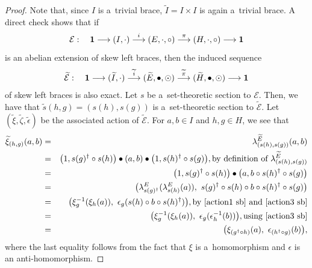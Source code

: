 \documentclass{jonasart}
\theoremstyle{plain}
\begin{document}
	\begin{proof}
		Note that, since $I$ is a~trivial brace, $\widetilde{I}= I \times I$ is again a~trivial brace. A direct check shows that if
		\[
		\mathcal{E} : \quad  {\bf 1} \longrightarrow (I,\cdot) \stackrel{i}{\longrightarrow}  (E,\cdot,\circ) \stackrel{\pi}{\longrightarrow} (H,\cdot,\circ) \longrightarrow {\bf 1}
		\]
		is an abelian extension of skew left braces, then the induced sequence
		\[
		\widetilde{\mathcal{E}}: \quad  {\bf 1} \longrightarrow (\widetilde{I},\cdot) \stackrel{\widetilde{i}}{\longrightarrow}  (\widetilde{E},\bullet,\odot) \stackrel{\widetilde{\pi}}{\longrightarrow} (\widetilde{H},\bullet,\odot) \longrightarrow {\bf 1}
		\]
		of skew left braces is also exact. Let $s$ be a~set-theoretic section to $\mathcal{E}$. Then, we have that $\widetilde{s}(h,g)=(s(h),s(g))$ is a~set-theoretic section to $\widetilde{\mathcal{E}}$. Let $(\widetilde{\xi}, \widetilde{\zeta}, \widetilde{\epsilon})$ be the associated action of $\widetilde{\mathcal{E}}$. For $a,b\in I$ and $h,g\in H$, we see that
		\begin{eqnarray}
			\widetilde{\xi}_{(h,g)}(a,b)&=&\lambda^{\widetilde{E}}_{(s(h),s(g))}(a,b)\nonumber\\
			&=& \big(1,s(g)^\dagger \circ s(h) \big) \bullet (a,b) \bullet \big(1,s(h)^\dagger\circ s(g)\big), \text{by definition of $\lambda^{\widetilde{E}}_{(s(h),s(g))}$}\nonumber\\
			&=& \big(1,s(g)^\dagger \circ s(h)\big) \bullet \big(a,b\circ s(h)^\dagger \circ s(g)\big)\nonumber\\
			&=& \big(\lambda^E_{s(g)^\dagger}(\lambda^E_{s(h)}(a)),~s(g)^\dagger \circ s(h)\circ b\circ s(h)^\dagger \circ s(g) \big)\nonumber\\
			&=& \big(\xi^{-1}_g (\xi_h (a)),~\epsilon_g (s(h)\circ b\circ s(h)^\dagger) \big), \text{by~\eqref{action1 sb} and~\eqref{action3 sb}}\nonumber\\
			&=& \big(\xi^{-1}_g (\xi_h (a)),~\epsilon_g (\epsilon^{-1}_h (b))\big), \text{using~\eqref{action3 sb}}\nonumber\\
			&=&\big(\xi_{(g^\dagger\circ h)}(a),~\epsilon_{(h^\dagger \circ g)}(b) \big),\label{tilde xi}
		\end{eqnarray}
		where the last equality follows from the fact that $\xi$ is a~homomorphism and $\epsilon$ is an anti-homomorphism.
		

\end{proof}
\end{document}
